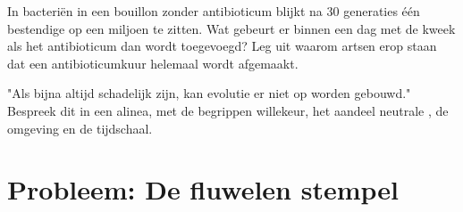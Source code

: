 \begin{exercise}[$\star\star\star$]\label{exo:g11:mutations:14}
In bacteriën in een bouillon zonder antibioticum blijkt na 30 generaties
één bestendige  op een miljoen te zitten. Wat gebeurt er binnen een
dag met de kweek als het antibioticum dan wordt toegevoegd? Leg uit
waarom artsen erop staan dat een antibioticumkuur helemaal wordt
afgemaakt.
\end{exercise}

\begin{exercise}[$\star\star\star$]\label{exo:g11:mutations:15}
"Als  bijna altijd schadelijk zijn, kan evolutie er niet op
worden gebouwd." Bespreek dit in een alinea, met de begrippen
willekeur, het aandeel neutrale , de omgeving en de tijdschaal.
\end{exercise}

\section{Probleem: De fluwelen stempel}

